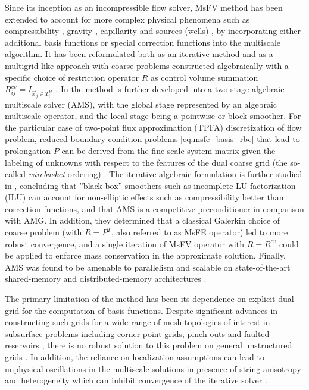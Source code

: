 Since its inception as an incompressible flow solver, MsFV method has been extended to account for more complex physical phenomena such as compressibility \cite{Lunati2006}, gravity \cite{Lunati2008,Lee2008}, capillarity \cite{Lee2008} and sources (wells) \cite{Wolfsteiner2006,Lee2008}, by incorporating either additional basis functions or special correction functions into the multiscale algorithm.   It has been reformulated both as an iterative method \cite{Hajibeygi2008} and as a multigrid-like approach with coarse problems constructed algebraically with a specific choice of restriction operator $R$ as control volume summation $R_{ij}^{cv} = I_{\vec{x}_j \in T_i^H}$ \cite{Zhou2008}.   In \cite{Zhou2010,Zhou2012} the method is further developed into a two-stage algebraic multiscale solver (AMS), with the global stage represented by an algebraic multiscale operator, and the local stage being a pointwise or block smoother.   For the particular case of two-point flux approximation (TPFA) discretization of flow problem, reduced boundary condition problems \eqref{eq:msfe_basis_rbc} that lead to prolongation $P$ can be derived from the fine-scale system matrix given the labeling of unknowns with respect to the features of the dual coarse grid (the so-called \textit{wirebasket} ordering) \cite{Zhou2010}.   The iterative algebraic formulation is further studied in \cite{Wang2014,Wang2015}, concluding that ''black-box'' smoothers such as incomplete LU factorization (ILU) can account for non-elliptic effects such as compressibility better than correction functions, and that AMS is a competitive preconditioner in comparison with AMG.   In addition, they determined that a classical Galerkin choice of coarse problem (with $R = P^T$, also referred to as MsFE operator) led to more robust convergence, and a single iteration of MsFV operator with $R = R^{cv}$ could be applied to enforce mass conservation in the approximate solution.   Finally, AMS was found to be amenable to parallelism and scalable on state-of-the-art shared-memory and distributed-memory architectures \cite{Manea2015,Manea2016,Manea2019}.

The primary limitation of the method has been its dependence on explicit dual grid for the computation of basis functions.   Despite significant advances in constructing such grids for a wide range of mesh topologies of interest in subsurface problems including corner-point grids, pinch-outs and faulted reservoirs \cite{Moyner2014a}, there is no robust solution to this problem on general unstructured grids \cite{Moyner2014}.   In addition, the reliance on localization assumptions can lead to unphysical oscillations in the multiscale solutions in presence of string anisotropy and heterogeneity which can inhibit convergence of the iterative solver \cite{Moyner2016}.

